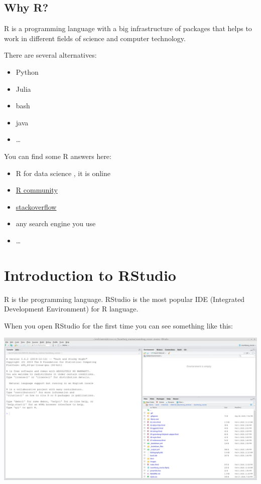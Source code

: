 \documentclass[
]{book}
\providecommand{\tightlist}{%
  \setlength{\itemsep}{0pt}\setlength{\parskip}{0pt}}
\begin{document}
\hypertarget{why-r}{%
\subsection{Why R?}\label{why-r}}

R \citep{r19} is a programming language with a big infrastructure of packages that helps to work in different fields of science and computer technology.

There are several alternatives:

\begin{itemize}
\tightlist
\item
  Python \citep{vanderplas16, grus19}
\item
  Julia \citep{bezanson17}
\item
  bash \citep{janssens14}
\item
  java \citep{brzustowicz17}
\item
  \ldots{}
\end{itemize}

You can find some R answers here:

\begin{itemize}
\tightlist
\item
  R for data science \citep{wickham16}, it is online
\item
  \href{https://community.rstudio.com/}{R community}
\item
  \href{https://stackoverflow.com}{stackoverflow}
\item
  any search engine you use
\item
  \ldots{}
\end{itemize}

\hypertarget{introduction-to-rstudio}{%
\section{Introduction to RStudio}\label{introduction-to-rstudio}}

R is the programming language. RStudio is the most popular IDE (Integrated Development Environment) for R language.

When you open RStudio for the first time you can see something like this:

\includegraphics{images/01.01.rstudio.png}
\end{document}

